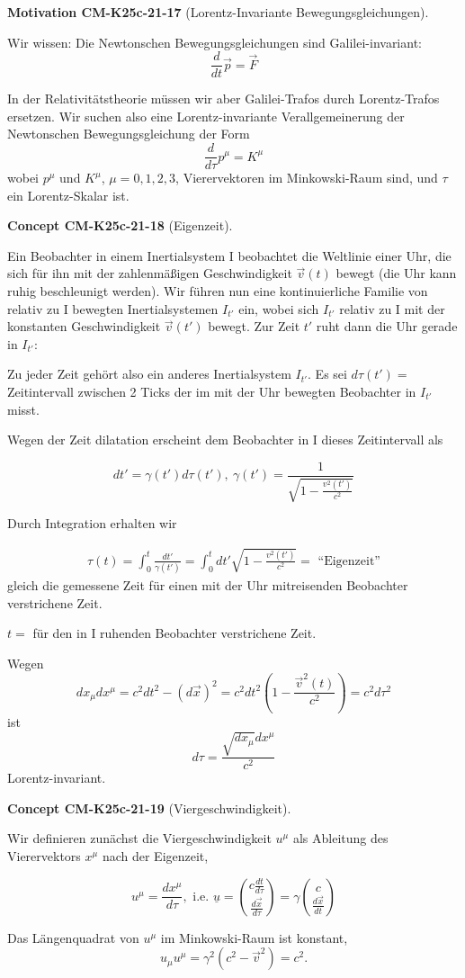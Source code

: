 \documentclass[10pt, letterpaper]{article}
\newcommand{\CustomHeading}[3]{%
  \par\medskip\noindent%
  \textbf{#1 #2} \textnormal{(#3)}.\enskip%
}
\newenvironment{CONC}[2]{\CustomHeading{Concept}{#1}{#2}}{}
\newenvironment{MOT}[2]{\CustomHeading{Motivation}{#1}{#2}}{}
\begin{document}
\begin{MOT}{CM-K25c-21-17}{Lorentz-Invariante Bewegungsgleichungen}
Wir wissen: Die Newtonschen Bewegungsgleichungen sind Galilei-invariant:
\[\frac{d}{dt}\vec{p} = \vec{F}\]

In der Relativitätstheorie müssen wir aber Galilei-Trafos durch Lorentz-Trafos ersetzen. Wir suchen also eine Lorentz-invariante Verallgemeinerung der Newtonschen Bewegungsgleichung der Form
\[\frac{d}{d\tau}p^\mu = K^\mu\]
wobei $p^\mu$ und $K^\mu$, $\mu=0,1,2,3$, Vierervektoren im Minkowski-Raum sind, und $\tau$ ein Lorentz-Skalar ist.
\end{MOT}

\begin{CONC}{CM-K25c-21-18}{Eigenzeit}
Ein Beobachter in einem Inertialsystem I beobachtet die Weltlinie einer Uhr, die sich für ihn mit der zahlenmäßigen Geschwindigkeit $\vec{v}(t)$ bewegt (die Uhr kann ruhig beschleunigt werden). Wir führen nun eine kontinuierliche Familie von relativ zu I bewegten Inertialsystemen $I_{t'}$ ein, wobei sich $I_{t'}$ relativ zu I mit der konstanten Geschwindigkeit $\vec{v}(t')$ bewegt. Zur Zeit $t'$ ruht dann die Uhr gerade in $I_{t'}$:


Zu jeder Zeit gehört also ein anderes Inertialsystem $I_{t'}$.
Es sei $d\tau(t') = $ Zeitintervall zwischen 2 Ticks der im mit der Uhr bewegten Beobachter in $I_{t'}$ misst.

Wegen der Zeit dilatation erscheint dem Beobachter in I dieses Zeitintervall als

$$dt' = \gamma(t') d\tau(t'),\ \gamma(t') = \frac{1}{\sqrt{1-\frac{v^2(t')}{c^2}}}$$

Durch Integration erhalten wir

\begin{align*}
\tau(t) = \int_0^t \frac{dt'}{\gamma(t')} = \int_0^t dt' \sqrt{1-\frac{v^2(t')}{c^2}} = \text{ ``Eigenzeit''}
\end{align*}
gleich die gemessene Zeit für einen mit der Uhr mitreisenden Beobachter verstrichene Zeit.

$t = $ für den in I ruhenden Beobachter verstrichene Zeit.

Wegen 
$$dx_\mu dx^\mu = c^2dt^2 -(d\vec{x})^2 = c^2 dt^2(1-\frac{\vec{v}^2(t)}{c^2}) = c^2 d\tau^2$$
ist 
$$d\tau = \frac{\sqrt{dx_\mu} dx^\mu}{c^2}$$ 
Lorentz-invariant.
\end{CONC}

\begin{CONC}{CM-K25c-21-19}{Viergeschwindigkeit}
Wir definieren zunächst die Viergeschwindigkeit $u^\mu$ als Ableitung des Vierervektors $x^\mu$ nach der Eigenzeit,

\[u^\mu = \frac{dx^\mu}{d\tau}, \text{ i.e. } \underline{u}=\binom{c \frac{d t}{d \tau}}{\frac{d \vec{x}}{d \tau}}=\gamma\binom{c}{\frac{d \vec{x}}{d t}}\]

Das Längenquadrat von $u^\mu$ im Minkowski-Raum ist konstant,
\[u_\mu u^\mu = \gamma^2(c^2-\vec{v}^2) = c^2.\]
\end{CONC}
\end{document}
